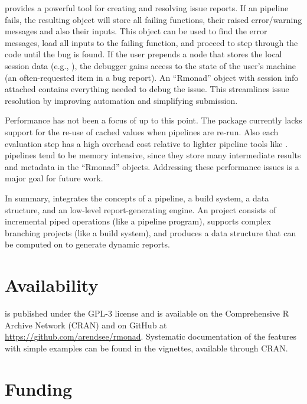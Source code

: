  provides a powerful tool for creating and resolving issue
reports. If an  pipeline fails, the resulting object will store
all failing functions, their raised error/warning messages and also their
inputs. This object can be used to find
the error messages, load all inputs to the failing function, and proceed
to step through the code until the bug is found. If the user prepends a node that
stores the local session data (e.g., ), the
debugger gains access to the state of the user's machine (an often-requested item in a bug report). An ``Rmonad'' object with session info attached contains everything needed to debug the issue.
This streamlines issue resolution by improving automation and simplifying submission.

Performance has not been a focus of  up to this point. The
package currently lacks support for the re-use of cached values when pipelines
are re-run. Also each evaluation step has a high overhead cost relative to
lighter pipeline tools like .  pipelines
tend to be memory intensive, since they store many intermediate results and
metadata in the ``Rmonad'' objects. Addressing these performance issues is a
major goal for future work.

In summary,  integrates the concepts of a pipeline, a build
system, a data structure, and an low-level report-generating engine. An
 project consists of 
incremental piped operations (like
a pipeline program), supports complex branching projects (like a build system),
and produces a data structure that can be computed on to generate dynamic
reports.

\section{Availability}

 is published under the GPL-3 license and is available on the Comprehensive R Archive Network (CRAN) and on GitHub at \url{https://github.com/arendsee/rmonad}. Systematic documentation of the features with simple examples can be found in the vignettes, available through CRAN.


\section{Funding}

